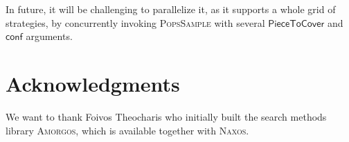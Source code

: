 \documentclass{ws-ijait}
\begin{document}
In future, it will be challenging to parallelize it, as it
supports a whole grid of strategies, by concurrently
invoking \textsc{PopsSample} with several
$\mathsf{PieceToCover}$ and $\mathsf{conf}$ arguments.


\section*{Acknowledgments}

We want to thank Foivos Theocharis who initially built the
search methods library \textsc{Amorgos}, which is available
together with \textsc{Naxos}.\cite{Naxos}



\end{document}
